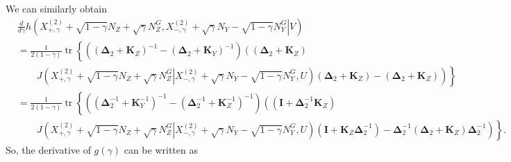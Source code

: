 \documentclass[journal,final, onecolumn]{IEEEtran}
\DeclareMathOperator{\tr}{tr}
\begin{document}
We can similarly obtain
\begin{align}
&\frac{d}{d\gamma} h\left(\left.X^{(2)}_{+, \gamma}+\sqrt{1-\gamma}N_{Z}+ \sqrt{\gamma}N_{Z}^{G}, X^{(2)}_{-, \gamma}+\sqrt{\gamma}N_{Y} - \sqrt{1-\gamma}N_{Y}^{G} \right| V \right)\nonumber \\
&=\frac{1}{2(1-\gamma)} \tr \left\{   \left(      \left( \boldsymbol{\Delta}_{2} + \boldsymbol{K}_{Z}  \right)^{-1} - \left( \boldsymbol{\Delta}_{2} + \boldsymbol{K}_{Y}  \right)^{-1}        \right)\left(\left( \boldsymbol{\Delta}_{2} + \boldsymbol{K}_{Z}  \right)\right.\right.\nonumber \\
& \qquad  \left.\left.J\left( \left.X^{(2)}_{+, \gamma}+\sqrt{1-\gamma}N_{Z}+ \sqrt{\gamma}N_{Z}^{G} \right| X^{(2)}_{-, \gamma}+\sqrt{\gamma}N_{Y} - \sqrt{1-\gamma}N_{Y}^{G},U \right)\left( \boldsymbol{\Delta}_{2} + \boldsymbol{K}_{Z}  \right)-\left( \boldsymbol{\Delta}_{2} + \boldsymbol{K}_{Z}  \right) \right)        \right\} \\
&=\frac{1}{2(1-\gamma)} \tr \left\{   \left(      \left( \boldsymbol{\Delta}^{-1}_{2} + \boldsymbol{K}^{-1}_{Y}  \right)^{-1} - \left( \boldsymbol{\Delta}^{-1}_{2} + \boldsymbol{K}^{-1}_{Z}  \right)^{-1}        \right)\left(\left( \boldsymbol{I} + \boldsymbol{\Delta}^{-1}_{2}\boldsymbol{K}_{Z}  \right)\right.\right.\nonumber \\
& \qquad   \left.\left.J\left( \left.X^{(2)}_{+, \gamma}+\sqrt{1-\gamma}N_{Z}+ \sqrt{\gamma}N_{Z}^{G} \right|X^{(2)}_{-, \gamma}+\sqrt{\gamma}N_{Y} - \sqrt{1-\gamma}N_{Y}^{G}, U \right)\left( \boldsymbol{I} + \boldsymbol{K}_{Z}\boldsymbol{\Delta}^{-1}_{2}  \right)-\boldsymbol{\Delta}_{2}^{-1}\left( \boldsymbol{\Delta}_{2} + \boldsymbol{K}_{Z}  \right)\boldsymbol{\Delta}_{2}^{-1} \right)        \right\}.
\end{align}
So, the derivative of $g(\gamma)$ can be written as
\end{document}
